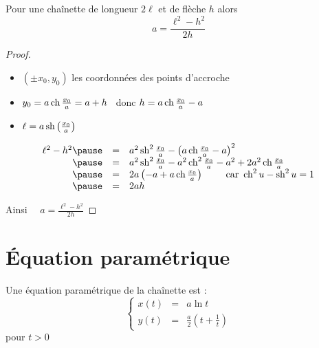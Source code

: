 \begin{frame}
\begin{proposition}
\label{prop:param}
\begin{minipage}{0.5\textwidth}
Pour une chaînette de longueur $2\ell$ et de flèche $h$ alors
$$a=\frac{\ell^2-h^2}{2h}$$
\end{minipage}\quad
\begin{minipage}{0.29\textwidth}
\shorthandoff{:}
\shorthandon{:}  
\end{minipage}\vspace*{-1ex}
\end{proposition}
\pause
\begin{proof}\vspace*{-1ex}
\begin{itemize}
  \item $(\pm x_0, y_0)$ les coordonnées des points d'accroche
  \pause
  \item $y_0 = a \mathop{\text{ch}}\nolimits \frac{x_0}{a} = a + h$ \pause \ donc $h = a \mathop{\text{ch}}\nolimits \frac{x_0}{a} -a$
  \pause
  \item $\ell =  a \mathop{\text{sh}}\nolimits \left( \frac{x_0}{a} \right)$
\end{itemize}
\vspace*{-2ex}
\pause
$$\begin{array}{rcl}
\ell^2 - h^2 
  \pause &=& a^2 \sh^2 \tfrac{x_0}{a} - \left( a \ch \tfrac{x_0}{a} - a \right)^2 \\
  \pause &=& a^2 \sh^2 \tfrac{x_0}{a} - a^2 \ch^2  \tfrac{x_0}{a} -a^2 +2 a^2 \ch \tfrac{x_0}{a} \\
  \pause &=& 2a\left(-a+a \ch \tfrac{x_0}{a} \right) \qquad \text{ car } \ch^2 u - \sh^2 u = 1 \\
  \pause &=& 2ah \\
\end{array}$$
\vspace*{-2ex}

\pause
Ainsi \ \ $a = \displaystyle\frac{\ell^2-h^2}{2h}$
\end{proof}
\end{frame}




\section{\'Equation paramétrique}

\begin{frame}
\begin{proposition}
Une équation paramétrique de la chaînette est :
$$\left\{
\begin{array}{rcl}
x(t) &=& a \ln t \\
y(t) &=& \frac a 2 \left(t+\frac 1 t\right)
\end{array}
\right.
$$
pour $t>0$
\end{proposition}

\end{frame}



